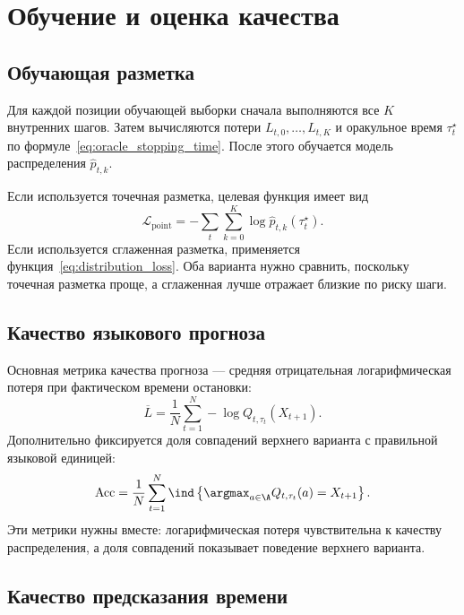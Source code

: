\section{Обучение и оценка качества}

\subsection{Обучающая разметка}

Для каждой позиции обучающей выборки сначала выполняются все \(K\) внутренних шагов. Затем вычисляются потери \(L_{t,0},\ldots,L_{t,K}\) и оракульное время \(\tau_t^\star\) по формуле~\eqref{eq:oracle_stopping_time}. После этого обучается модель распределения \(\widehat p_{t,k}\).

Если используется точечная разметка, целевая функция имеет вид
\begin{equation}
  \mathcal L_{\mathrm{point}}
  =-\sum_t\sum_{k=0}^{K}\log \widehat p_{t,k}(\tau_t^\star).
  \label{eq:point_loss}
\end{equation}
Если используется сглаженная разметка, применяется функция~\eqref{eq:distribution_loss}. Оба варианта нужно сравнить, поскольку точечная разметка проще, а сглаженная лучше отражает близкие по риску шаги.

\subsection{Качество языкового прогноза}

Основная метрика качества прогноза --- средняя отрицательная логарифмическая потеря при фактическом времени остановки:
\begin{equation}
  \overline L=\frac{1}{N}\sum_{t=1}^{N}-\log Q_{t,\tau_t}(X_{t+1}).
  \label{eq:mean_nll}
\end{equation}
Дополнительно фиксируется доля совпадений верхнего варианта с правильной языковой единицей:
\begin{equation}
  \mathrm{Acc}=\frac{1}{N}\sum_{t=1}^{N}
  \ind\left\{\argmax_{a\in\A}Q_{t,\tau_t}(a)=X_{t+1}\right\}.
  \label{eq:accuracy}
\end{equation}
Эти метрики нужны вместе: логарифмическая потеря чувствительна к качеству распределения, а доля совпадений показывает поведение верхнего варианта.

\subsection{Качество предсказания времени}

